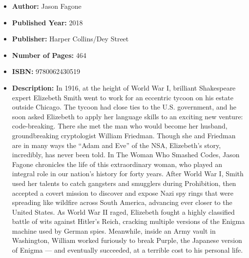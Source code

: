 \documentclass{tufte-handout}
\begin{document}
\begin{itemize}
    \item[] \textbf{Author:} Jason Fagone 
    \item[] \textbf{Published Year:} 2018
    \item[] \textbf{Publisher:} Harper Collins/Dey Street
    \item[] \textbf{Number of Pages:} 464    
    \item[] \textbf{ISBN:} 9780062430519
    \item[] \textbf{Description:} In 1916, at the height of World War I, brilliant Shakespeare expert Elizebeth Smith went to work for an eccentric tycoon on his estate outside Chicago. The tycoon had close ties to the U.S. government, and he soon asked Elizebeth to apply her language skills to an exciting new venture: code-breaking. There she met the man who would become her husband, groundbreaking cryptologist William Friedman. Though she and Friedman are in many ways the ``Adam and Eve'' of the NSA, Elizebeth’s story, incredibly, has never been told. In The Woman Who Smashed Codes, Jason Fagone chronicles the life of this extraordinary woman, who played an integral role in our nation’s history for forty years. After World War I, Smith used her talents to catch gangsters and smugglers during Prohibition, then accepted a covert mission to discover and expose Nazi spy rings that were spreading like wildfire across South America, advancing ever closer to the United States. As World War II raged, Elizebeth fought a highly classified battle of wits against Hitler’s Reich, cracking multiple versions of the Enigma machine used by German spies. Meanwhile, inside an Army vault in Washington, William worked furiously to break Purple, the Japanese version of Enigma --- and eventually succeeded, at a terrible cost to his personal life.
\end{itemize}
\end{document}
